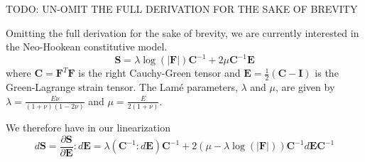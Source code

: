 TODO: UN-OMIT THE FULL DERIVATION FOR THE SAKE OF BREVITY

Omitting the full derivation for the sake of brevity, we are currently interested in the Neo-Hookean constitutive model.
\begin{equation}
\boldsymbol{S} = \lambda \log \left( \lvert \boldsymbol{F} \rvert \right) \boldsymbol{C}^{-1} + 2 \mu \boldsymbol{C}^{-1} \boldsymbol{E}
\label{constitutive}
\end{equation}
where $\boldsymbol{C} = \boldsymbol{F}^T \boldsymbol{F}$ is the right Cauchy-Green tensor and $\boldsymbol{E} = \frac{1}{2} \left( \boldsymbol{C} - \boldsymbol{I} \right)$ is the Green-Lagrange strain tensor.
The Lam{\'e} parameters, $\lambda$ and $\mu$, are given by $\lambda = \frac{E \nu}{\left( 1 + \nu \right)\left( 1 - 2 \nu \right)}$ and $\mu = \frac{E}{2 \left( 1 + \nu \right)}$.

We therefore have in our linearization
\begin{equation}
d \boldsymbol{S} = \frac{\partial \boldsymbol{S}}{\partial \boldsymbol{E}} : d \boldsymbol{E} = \lambda (\boldsymbol{C}^{-1} : d \boldsymbol{E}) \boldsymbol{C}^{-1} + 2 (\mu - \lambda \log \left( \lvert \boldsymbol{F} \rvert \right)) \boldsymbol{C}^{-1} d \boldsymbol{E} \boldsymbol{C}^{-1}
\label{dconstitutive}
\end{equation}
